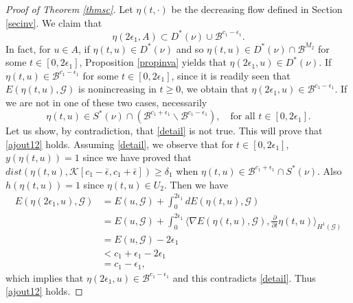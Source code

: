 \documentclass[10pt,a4paper]{article}
\theoremstyle{definition} \theoremstyle{remark}
\numberwithin{equation}{section}
\newcommand{\G}{\mathcal{G}}
\newcommand{\B}{\mathcal{B}}
\newcommand{\K}{\mathcal{K}}
\begin{document}
\begin{proof} [Proof of Theorem \ref{thmsc}]
Let $\eta(t,\cdot)$ be the decreasing flow defined in Section \ref{secinv}.
We claim that
\begin{equation}\label{ajout12}
\eta(2\epsilon_1,A) \subset D^*(\nu) \cup \B^{c_1 - \epsilon_1}. 
\end{equation}
In fact, for $u \in A$, if $\eta(t,u) \in D^*(\nu)$ and so $\eta(t,u) \in D^*(\nu) \cap \B^{M_2}$ for some $t \in [0,2\epsilon_1]$, Proposition \ref{propinva} yields that $\eta(2\epsilon_1,u) \in D^*(\nu)$. If $\eta(t,u) \in \B^{c_1 - \epsilon_1}$ for some $t \in [0,2\epsilon_1]$, since it is readily seen that $E(\eta(t,u),\G)$ is nonincreasing in $t \geq 0$, we obtain that $\eta(2\epsilon_1,u) \in \B^{c_1 - \epsilon_1}$.  If we are not in one of these two cases, necessarily 
\begin{equation}\label{detail}
\eta(t,u) \in S^*(\nu) \cap (\B^{c_1+\epsilon_1} \backslash \B^{c_1 - \epsilon_1}), \quad \mbox{for all } t \in [0,2\epsilon_1].
\end{equation}
Let us show, by contradiction, that \eqref{detail} is not true. This will prove that \eqref{ajout12} holds. Assuming \eqref{detail}, we observe that for $t \in [0,2\epsilon_1]$, $y(\eta(t,u)) = 1$ since we have proved that $dist(\eta(t,u),\K[c_1-\bar{\epsilon},c_1+\bar{\epsilon}]) \geq \delta_1$ when $\eta(t,u) \in \B^{c_1+\epsilon_1} \cap S^*(\nu)$. Also $h(\eta(t,u)) = 1$ since $\eta(t,u) \in U_2$. Then we have
\begin{align*}
	E(\eta(2\epsilon_1,u),\G) & = E(u,\G) + \int_0^{2\epsilon_1}dE(\eta(t,u),\G) \\
	& = E(u,\G) + \int_0^{2\epsilon_1} \bigl\langle \nabla E(\eta(t,u),\G),\frac{\partial}{\partial t}\eta(t,u) \bigr\rangle_{H^1(\G)} \\
	& = E(u,\G) - 2\epsilon_1 \\
	& < c_1 + \epsilon_1 - 2\epsilon_1 \\
	& = c_1 - \epsilon_1,
\end{align*}
which implies that $\eta(2\epsilon_1,u) \in \B^{c_1-\epsilon_1}$ and this contradicts  \eqref{detail}. Thus \eqref{ajout12} holds.



\end{proof}
\end{document}
